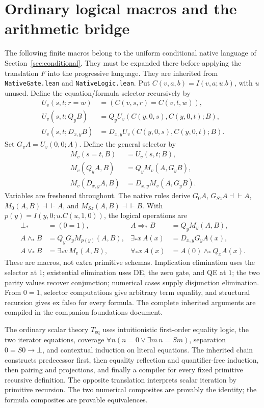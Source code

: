 \documentclass[11pt,a4paper]{article}
\theoremstyle{definition}\newtheorem{definition}[theorem]{Definition}
\newcommand{\Teq}{T_{\mathrm{eq}}}
\newcommand{\eqv}{\dashv\vdash}
\begin{document}
\appendix
\section{Ordinary logical macros and the arithmetic bridge}
\label{sec:macros}

The following finite macros belong to the uniform conditional native
language of Section~\ref{sec:conditional}. They must be expanded there
before applying the translation $F$ into the progressive language.
They are inherited from \texttt{NativeGate.lean} and
\texttt{NativeLogic.lean}.\cite{native}
Put $C(v,a,b)=I(v,a;u.b)$, with $u$ unused. Define the equation/formula
selector recursively by
\[
\begin{aligned}
U_v(s,t;r=w)&=(C(v,s,r)=C(v,t,w)),\\
U_v(s,t;Q_yB)&=Q_yU_v(C(y,0,s),C(y,0,t);B),\\
U_v(s,t;D_{x,y}B)&=D_{x,y}U_v(C(y,0,s),C(y,0,t);B).
\end{aligned}
\]
Set $G_vA=U_v(0,0;A)$. Define the general selector by
\[
\begin{aligned}
M_v(s=t,B)&=U_v(s,t;B),\\
M_v(Q_yA,B)&=Q_yM_v(A,G_yB),\\
M_v(D_{x,y}A,B)&=D_{x,y}M_v(A,G_yB).
\end{aligned}
\]
Variables are freshened throughout. The native rules derive
$G_0A$, $G_{Sz}A\eqv A$, $M_0(A,B)\eqv A$, and
$M_{Sz}(A,B)\eqv B$. With
$p(y)=I(y,0;u.C(u,1,0))$, the logical operations are
\[
\begin{aligned}
\bot_*&=(0=1),&
A\Rightarrow_*B&=Q_yM_y(A,B),\\
A\wedge_*B&=Q_yG_yM_{p(y)}(A,B),&
\exists_*x\,A(x)&=D_{x,y}G_yA(x),\\
A\vee_*B&=\exists_*v\,M_v(A,B),&
\forall_*x\,A(x)&=A(0)\wedge_*Q_xA(x).
\end{aligned}
\]
These are macros, not extra primitive schemas. Implication elimination
uses the selector at $1$; existential elimination uses DE, the zero gate,
and QE at $1$; the two parity values recover conjunction; numerical
cases supply disjunction elimination. From $0=1$, selector computations
give arbitrary term equality, and structural recursion gives ex falso
for every formula. The complete inherited arguments are compiled in
the companion foundations document.

The ordinary scalar theory $\Teq$ uses intuitionistic first-order
equality logic, the two iterator equations, coverage
$\forall n(n=0\vee\exists m\,n=Sm)$, separation
$0=S0\to\bot$, and contextual induction on literal equations.
The inherited chain constructs predecessor first, then equality
reflection and quantifier-free induction, then pairing and projections,
and finally a compiler for every fixed primitive recursive definition.
The opposite translation interprets scalar iteration by primitive
recursion. The two numerical composites are provably the identity;
the formula composites are provable equivalences.\cite{bridge}
\end{document}
